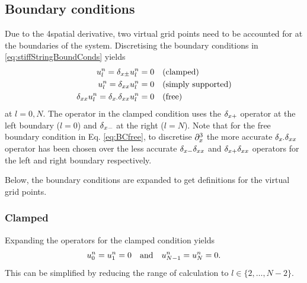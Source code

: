 \subsection{Boundary conditions}\label{sec:stiffStringBoundaryConditions}
Due to the 4\thOrder spatial derivative, two virtual grid points need to be accounted for at the boundaries of the system. Discretising the boundary conditions in \eqref{eq:stiffStringBoundConds} yields
\begin{subequations}\label{eq:stiffStringBoundCondsDisc}
    \begin{align}
        u_l^n = \delta_{x\pm} u_l^n &= 0 \quad \text{(clamped)}\label{eq:BCclampedDisc}\\
        u_l^n = \delta_{xx} u_l^n &= 0 \quad \text{(simply supported)}\label{eq:BCsimplySupportedDisc}\\
        \delta_{xx} u_l^n = \delta_{x\cdot}\delta_{xx} u_l^n &= 0 \quad \text{(free)}\label{eq:BCfreeDisc}
    \end{align}
\end{subequations}
at $l = 0, N$. The operator in the clamped condition uses the $\delta_{x+}$ operator at the left boundary ($l = 0$) and $\delta_{x-}$ at the right ($l = N$). Note that for the free boundary condition in Eq. \eqref{eq:BCfree}, to discretise $\partial_x^3$ the more accurate $\delta_{x\cdot}\delta_{xx}$ operator has been chosen over the less accurate $\delta_{x-} \delta_{xx}$ and $\delta_{x+} \delta_{xx}$ operators for the left and right boundary respectively.

Below, the boundary conditions are expanded to get definitions for the virtual grid points. 


\subsubsection{Clamped}
Expanding the operators for the clamped condition yields 
\begin{equation}
    u_0^n = u_1^n = 0 \quad \text{and} \quad u_{N-1}^n = u_N^n = 0.
\end{equation}
This can be simplified by reducing the range of calculation to $l\in \{ 2, \hdots, N-2\}$.

